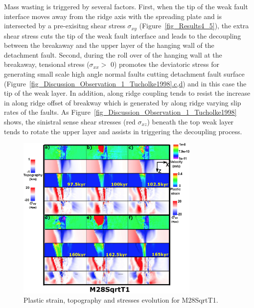 Mass wasting is triggered by several factors. First, when the tip of the weak fault interface moves away from the ridge axis with the spreading plate and is intersected by a pre-exisitng shear stress $\sigma_{xy}$ (Figure~\hyperref[fig_Results4_5]{\ref{fig_Results4_5}}), the extra shear stress cuts the tip of the weak fault interface and leads to the decoupling between the breakaway and the upper layer of the hanging wall of the detachment fault. Second, during the roll over of the hanging wall at the breakaway, tensional stress ($\sigma_{xx} >$ 0) promotes the deviatoric stress for generating small scale high angle normal faults cutting detachment fault surface \citep{Tucholke1998} (Figure~\hyperref[fig_Discussion_Observation_1_Tucholke1998]{\ref{fig_Discussion_Observation_1_Tucholke1998}.c,d}) and in this case the tip of the weak layer. In addition, along ridge coupling tends to resist the increase in along ridge offset of breakway which is generated by along ridge varying slip rates of the faults. As Figure~\hyperref[fig_Discussion_Observation_1_Tucholke1998]{\ref{fig_Discussion_Observation_1_Tucholke1998}} shows, the sinistral sense shear stresses (red $\sigma_{xz}$) beneath the top weak layer tends to rotate the upper layer and assists in triggering the decoupling process.  

\begin{figure}[h]
  \centering
    \includegraphics[width=0.8\textwidth]{./Figures/fig_Results4_4_sqrt_cut_back_with_time_1.eps}
  \caption{Plastic strain, topography and stresses evolution for M28SqrtT1.}
 \label{fig_Results4_4}
\end{figure}  

